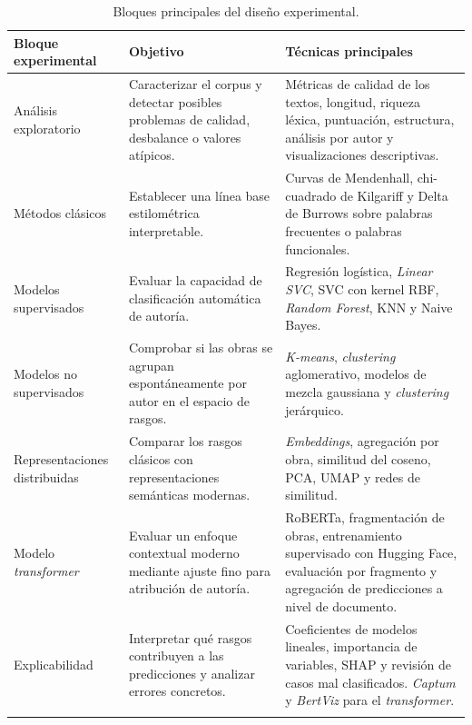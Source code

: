 \documentclass[IB]{TFUOC}%
\begin{document}
\begin{longtable}{|p{4.5cm}|p{5.2cm}|p{5.8cm}|}
\hline
\textbf{Bloque experimental} & \textbf{Objetivo} & \textbf{Técnicas principales} \\
\hline

Análisis exploratorio &
Caracterizar el corpus y detectar posibles problemas de calidad, desbalance o valores atípicos. &
Métricas de calidad de los textos, longitud, riqueza léxica, puntuación, estructura, análisis por autor y visualizaciones descriptivas. \\
\hline

Métodos clásicos &
Establecer una línea base estilométrica interpretable. &
Curvas de Mendenhall, chi-cuadrado de Kilgariff y Delta de Burrows sobre palabras frecuentes o palabras funcionales. \\
\hline

Modelos supervisados &
Evaluar la capacidad de clasificación automática de autoría. &
Regresión logística, \textit{Linear SVC}, SVC con kernel RBF, \textit{Random Forest}, KNN y Naive Bayes. \\
\hline

Modelos no supervisados &
Comprobar si las obras se agrupan espontáneamente por autor en el espacio de rasgos. &
\textit{K-means}, \textit{clustering} aglomerativo, modelos de mezcla gaussiana y \textit{clustering} jerárquico. \\
\hline

Representaciones distribuidas &
Comparar los rasgos clásicos con representaciones semánticas modernas. &
\textit{Embeddings}, agregación por obra, similitud del coseno, PCA, UMAP y redes de similitud. \\
\hline

Modelo \textit{transformer} &
Evaluar un enfoque contextual moderno mediante ajuste fino para atribución de autoría. &
RoBERTa, fragmentación de obras, entrenamiento supervisado con Hugging Face, evaluación por fragmento y agregación de predicciones a nivel de documento. \\
\hline

Explicabilidad &
Interpretar qué rasgos contribuyen a las predicciones y analizar errores concretos. &
Coeficientes de modelos lineales, importancia de variables, SHAP y revisión de casos mal clasificados. \textit{Captum} y \textit{BertViz} para el \textit{transformer}. \\
\hline

\caption{Bloques principales del diseño experimental.}
\label{tab:diseno_experimental}
\end{longtable}
\end{document}
